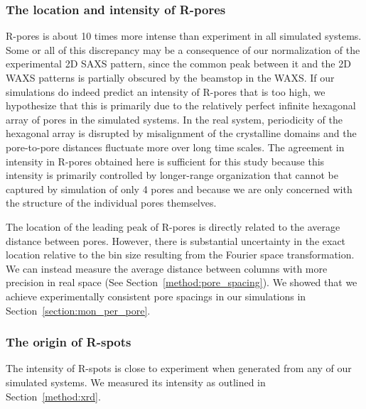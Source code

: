 \documentclass[journal=jpcbfk,manuscript=article]{achemso}
\begin{document}
  \subsubsection{The location and intensity of R-pores}\label{section:rpores}
  
  R-pores is about 10 times more intense than experiment in all simulated
  systems. Some or all of this discrepancy may be a consequence of our
  normalization of the experimental 2D SAXS pattern, since the common peak
  between it and the 2D WAXS patterns is partially obscured by the beamstop in
  the WAXS. If our simulations do indeed predict an intensity of R-pores that is
  too high, we hypothesize that this is primarily due to the relatively perfect
  infinite hexagonal array of pores in the simulated systems. In the real system,
  periodicity of the hexagonal array is disrupted by misalignment of the
  crystalline domains and the pore-to-pore distances fluctuate more over long
  time scales. The agreement in intensity in R-pores obtained here is sufficient for this
  study because this intensity is primarily controlled by longer-range
  organization that cannot be captured by simulation of only 4 pores and because
  we are only concerned with the structure of the individual pores themselves. 
  
  The location of the leading peak of R-pores is directly related to the
  average distance between pores. However, there is substantial uncertainty in
  the exact location relative to the bin size resulting from the Fourier space
  transformation. We can instead measure the average distance between columns
  with more precision in real space (See Section~\ref{method:pore_spacing}). We
  showed that we achieve experimentally consistent pore spacings in our
  simulations in Section~\ref{section:mon_per_pore}. 

  \subsubsection{The origin of R-spots}\label{section:rspots}
  
  The intensity of R-spots is close to experiment when generated from any of
  our simulated systems. We measured its intensity as outlined in Section~\ref{method:xrd}.
  
\end{document}
